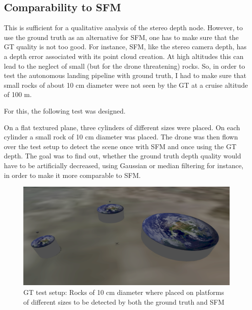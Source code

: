 \subsection{Comparability to SFM}

This is sufficient for a qualitative analysis of the stereo depth node. However, to use the ground truth as an alternative for SFM, one has to make sure that the GT quality is not too good. For instance, SFM, like the stereo camera depth, has a depth error associated with its point cloud creation. At high altitudes this can lead to the neglect of small (but for the drone threatening) rocks. So, in order to test the autonomous landing pipeline with ground truth, I had to make sure that small rocks of about 10 cm diameter were not seen by the GT at a cruise altitude of 100 m.

For this, the following test was designed.

On a flat textured plane, three cylinders of different sizes were placed. On each cylinder a small rock of 10 cm diameter was placed. The drone was then flown over the test setup to detect the scene once with SFM and once using the GT depth. The goal was to find out, whether the ground truth depth quality would have to be artificially decreased, using Gaussian or median filtering for instance, in order to make it more comparable to SFM.

\begin{figure}[ht]
\centering
\includegraphics[scale=0.18]{images/methodology/Test.png}
\caption{GT test setup: Rocks of 10 cm diameter where placed on platforms of different sizes to be detected by both the ground truth and SFM}
\label{fig:gt_test_setup}
\end{figure}


